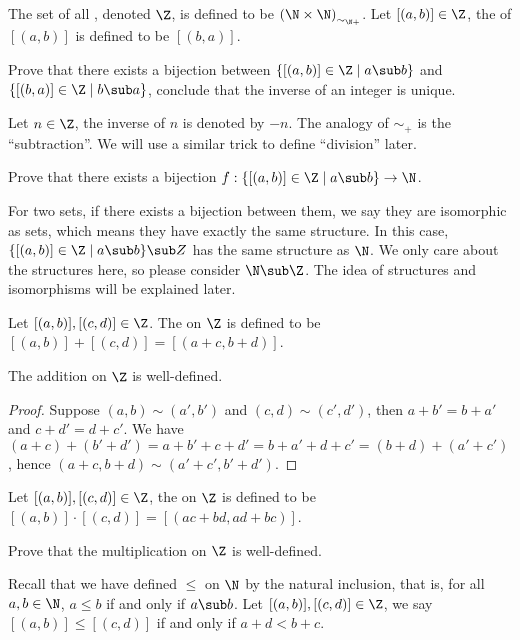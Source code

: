 \documentclass[10pt]{article}
\begin{document}
\begin{definition}
    The set of all , denoted $\Z$, is defined to be ${(\N\times{\N})}_{{\sim}_{\N+}}$. Let $[(a,b)]\in\Z$, the  of $[(a,b)]$ is defined to be $[(b,a)]$.
\end{definition}
\begin{problem}
    Prove that there exists a bijection between $\{[(a,b)]\in\Z\mid a\sub b\}$ and $\{[(b,a)]\in\Z\mid b\sub a\}$, conclude that the inverse of an integer is unique.
\end{problem}
\par
Let $n\in\Z$, the inverse of $n$ is denoted by $-n$. The analogy of ${\sim}_{+}$ is  the ``subtraction''. We will use a similar trick to define ``division'' later.
\begin{problem}
    Prove that there exists a bijection $f:\{[(a,b)]\in\Z\mid a\sub b\}\to\N$.
\end{problem}
\par
For two sets, if there exists a bijection between them, we say they are isomorphic as sets, which means they have exactly the same structure. In this case, $\{[(a,b)]\in\Z\mid a\sub b\}\sub Z$ has the same structure as $\N$. We only care about the structures here, so please consider $\N\sub\Z$. The idea of structures and isomorphisms will be explained later.
\begin{definition}
    Let $[(a,b)],[(c,d)]\in\Z$. The  on $\Z$ is defined to be $[(a,b)]+[(c,d)]=[(a+c,b+d)]$.
\end{definition}
\begin{proposition}
    The addition on $\Z$ is well-defined.
\end{proposition}
\begin{proof}
    Suppose $(a,b)\sim(a',b')$ and $(c,d)\sim(c',d')$, then $a+b'=b+a'$ and $c+d'=d+c'$. We have $(a+c)+(b'+d')=a+b'+c+d'=b+a'+d+c'=(b+d)+(a'+c')$, hence $(a+c,b+d)\sim(a'+c',b'+d')$.
\end{proof}
\begin{definition}
    Let $[(a,b)],[(c,d)]\in\Z$, the  on $\Z$ is defined to be $[(a,b)]\cdot[(c,d)]=[(ac+bd,ad+bc)]$.
\end{definition}
\begin{problem}
    Prove that the multiplication on $\Z$ is well-defined.
\end{problem}
\par
Recall that we have defined $\le$ on $\N$ by the natural inclusion, that is, for all $a,b\in\N$, $a\le b$ if and only if $a\sub b$. Let $[(a,b)],[(c,d)]\in\Z$, we say $[(a,b)]\le[(c,d)]$ if and only if $a+d<b+c$.
\end{document}
